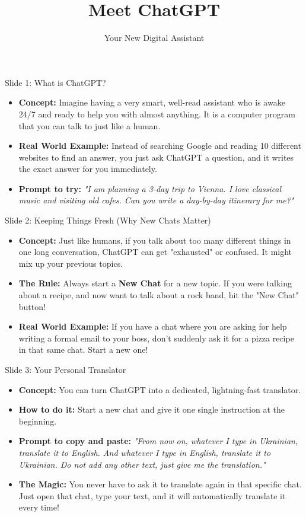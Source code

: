 \documentclass[aspectratio=169]{beamer}
\title{Meet ChatGPT}
\subtitle{Your New Digital Assistant}
\author{}
\date{}
\begin{document}
\begin{frame}
    \titlepage
\end{frame}

\begin{frame}{Slide 1: What is ChatGPT?}
    \begin{itemize}
        \item \textbf{Concept:} Imagine having a very smart, well-read assistant who is awake 24/7 and ready to help you with almost anything. It is a computer program that you can talk to just like a human.
        \item \textbf{Real World Example:} Instead of searching Google and reading 10 different websites to find an answer, you just ask ChatGPT a question, and it writes the exact answer for you immediately.
        \item \textbf{Prompt to try:} \textit{"I am planning a 3-day trip to Vienna. I love classical music and visiting old cafes. Can you write a day-by-day itinerary for me?"}
    \end{itemize}
\end{frame}

\begin{frame}{Slide 2: Keeping Things Fresh (Why New Chats Matter)}
    \begin{itemize}
        \item \textbf{Concept:} Just like humans, if you talk about too many different things in one long conversation, ChatGPT can get "exhausted" or confused. It might mix up your previous topics.
        \item \textbf{The Rule:} Always start a \textbf{New Chat} for a new topic. If you were talking about a recipe, and now want to talk about a rock band, hit the "New Chat" button!
        \item \textbf{Real World Example:} If you have a chat where you are asking for help writing a formal email to your boss, don't suddenly ask it for a pizza recipe in that same chat. Start a new one!
    \end{itemize}
\end{frame}

\begin{frame}{Slide 3: Your Personal Translator}
    \begin{itemize}
        \item \textbf{Concept:} You can turn ChatGPT into a dedicated, lightning-fast translator.
        \item \textbf{How to do it:} Start a new chat and give it one single instruction at the beginning.
        \item \textbf{Prompt to copy and paste:} \textit{"From now on, whatever I type in Ukrainian, translate it to English. And whatever I type in English, translate it to Ukrainian. Do not add any other text, just give me the translation."}
        \item \textbf{The Magic:} You never have to ask it to translate again in that specific chat. Just open that chat, type your text, and it will automatically translate it every time!
    \end{itemize}
\end{frame}
\end{document}
